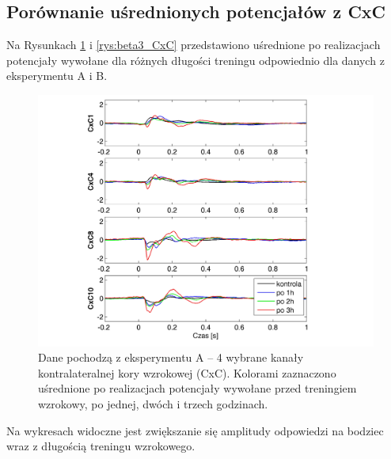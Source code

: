 \documentclass{pracamgr_2}
\begin{document}
\subsection{Porównanie uśrednionych potencjałów z CxC}
Na Rysunkach \ref{rys:kontrola15_CxC} i \ref{rys:beta3_CxC} przedstawiono uśrednione po realizacjach potencjały wywołane dla różnych długości treningu odpowiednio dla danych z eksperymentu A i B.
\begin{figure}[htbp]
	\begin{center}
		\includegraphics[scale=0.8]{kontrola15_CxC.png}
	\end{center}
	\caption{Dane pochodzą z eksperymentu A -- 4 wybrane kanały kontralateralnej kory wzrokowej (CxC). Kolorami zaznaczono uśrednione po realizacjach potencjały wywołane przed treningiem wzrokowy, po jednej, dwóch i trzech godzinach.}
	\label{rys:kontrola15_CxC}
\end{figure}
\FloatBarrier
Na wykresach widoczne jest zwiększanie się amplitudy odpowiedzi na bodziec wraz z długością treningu wzrokowego.
\end{document}
